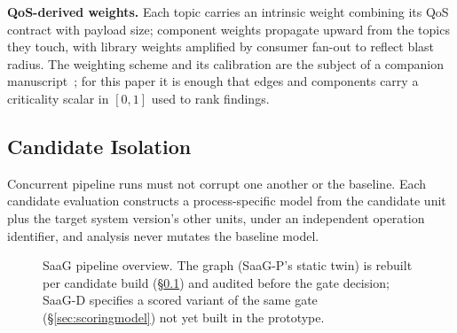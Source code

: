 \documentclass[sigconf,9pt]{acmart}
\begin{document}
\textbf{QoS-derived weights.} Each topic carries an intrinsic weight combining its QoS contract
with payload size; component weights propagate upward from the topics they touch, with library
weights amplified by consumer fan-out to reflect blast radius. The weighting scheme and its
calibration are the subject of a companion manuscript~\cite{companion2026}; for this paper it is
enough that edges and components carry a criticality scalar in $[0,1]$ used to rank findings.

\subsection{Candidate Isolation}
\label{sec:isolation}

Concurrent pipeline runs must not corrupt one another or the baseline. Each candidate evaluation
constructs a process-specific model from the candidate unit plus the target system version's other
units, under an independent operation identifier, and analysis never mutates the baseline model.

\begin{figure}[t]
\centering
{}
\caption{SaaG pipeline overview. The graph (SaaG-P's static twin) is rebuilt per candidate build
(\S\ref{sec:isolation}) and audited before the gate decision; SaaG-D specifies a scored variant of
the same gate (\S\ref{sec:scoringmodel}) not yet built in the prototype.}
\label{fig:architecture}
\end{figure}
\end{document}
